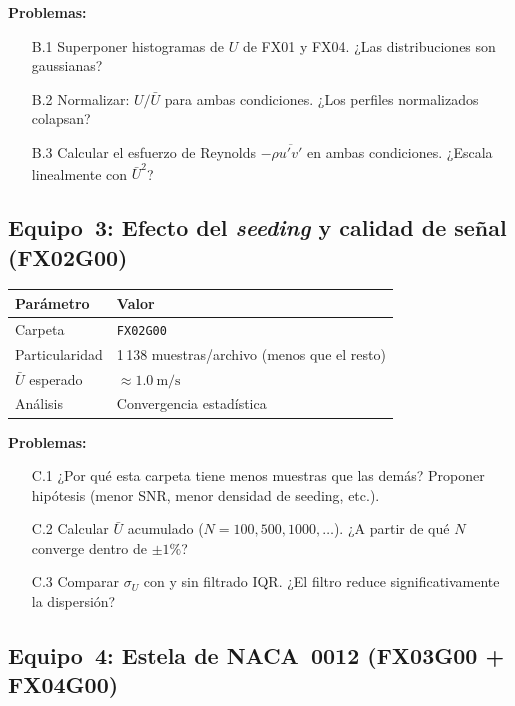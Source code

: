 \documentclass[12pt,a4paper]{article}
\begin{document}
\textbf{Problemas:}
\begin{enumerate}
	\item[B.1] Superponer histogramas de $U$ de FX01 y FX04.
	      ¿Las distribuciones son gaussianas?
	\item[B.2] Normalizar: $U/\bar{U}$ para ambas condiciones.
	      ¿Los perfiles normalizados colapsan?
	\item[B.3] Calcular el esfuerzo de Reynolds $-\rho\overline{u'v'}$ en
	      ambas condiciones.  ¿Escala linealmente con $\bar{U}^2$?
\end{enumerate}

\subsection{Equipo~3: Efecto del \emph{seeding} y calidad de señal (FX02G00)}
\label{subsec:equipo3}

\begin{table}[H]
	\centering
	\begin{tabular}{ll}
		\toprule
		\textbf{Parámetro} & \textbf{Valor}              \\
		\midrule
		Carpeta            & \texttt{FX02G00}            \\
		Particularidad     & 1\,138 muestras/archivo
		(menos que el resto)                             \\
		$\bar{U}$ esperado & $\approx\SI{1,0}{\m\per\s}$ \\
		Análisis           & Convergencia estadística    \\
		\bottomrule
	\end{tabular}
\end{table}

\textbf{Problemas:}
\begin{enumerate}
	\item[C.1] ¿Por qué esta carpeta tiene menos muestras que las demás?
	      Proponer hipótesis (menor SNR, menor densidad de seeding, etc.).
	\item[C.2] Calcular $\bar{U}$ acumulado ($N = 100, 500, 1000, \ldots$).
	      ¿A partir de qué $N$ converge dentro de $\pm 1\%$?
	\item[C.3] Comparar $\sigma_U$ con y sin filtrado IQR.  ¿El filtro
	      reduce significativamente la dispersión?
\end{enumerate}

\subsection{Equipo~4: Estela de NACA~0012 (FX03G00 + FX04G00)}
\label{subsec:equipo4}
\end{document}
